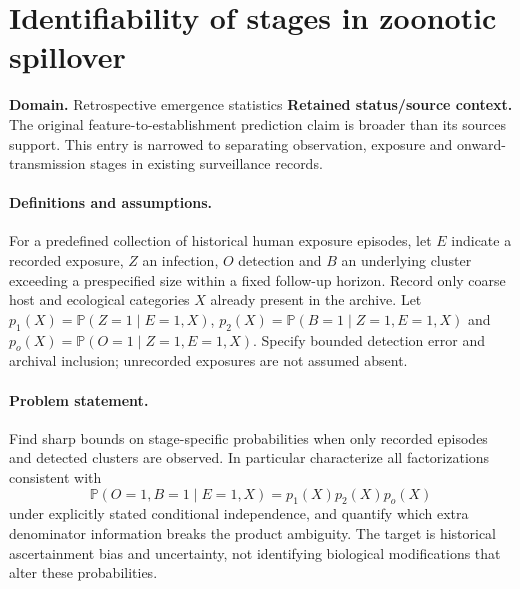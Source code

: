 \documentclass[11pt]{article}
\begin{document}
\section*{Identifiability of stages in zoonotic spillover}
\label{prob:209}
\label{rank:244}
\par\smallskip

\noindent\textbf{Domain.} Retrospective emergence statistics \quad \textbf{Retained status/source context.} The original feature-to-establishment prediction claim is broader than its sources support. This entry is narrowed to separating observation, exposure and onward-transmission stages in existing surveillance records.
\paragraph{Definitions and assumptions.} For a predefined collection of historical human exposure episodes, let $E$ indicate a recorded exposure, $Z$ an infection, $O$ detection and $B$ an underlying cluster exceeding a prespecified size within a fixed follow-up horizon. Record only coarse host and ecological categories $X$ already present in the archive. Let $p_1(X)=\mathbb{P}(Z=1\mid E=1,X)$, $p_2(X)=\mathbb{P}(B=1\mid Z=1,E=1,X)$ and $p_o(X)=\mathbb{P}(O=1\mid Z=1,E=1,X)$. Specify bounded detection error and archival inclusion; unrecorded exposures are not assumed absent.
\paragraph{Problem statement.} Find sharp bounds on stage-specific probabilities when only recorded episodes and detected clusters are observed. In particular characterize all factorizations consistent with
    \[\mathbb{P}(O=1,B=1\mid E=1,X)=p_1(X)p_2(X)p_o(X)\]
    under explicitly stated conditional independence, and quantify which extra denominator information breaks the product ambiguity. The target is historical ascertainment bias and uncertainty, not identifying biological modifications that alter these probabilities.
\end{document}
